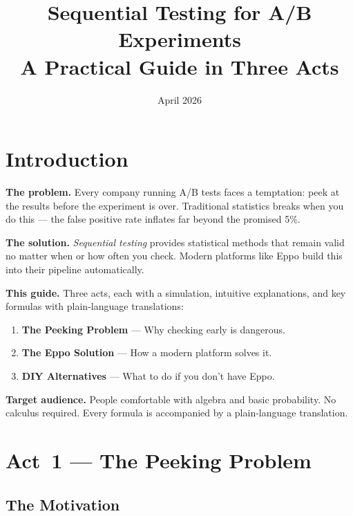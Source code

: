 \documentclass[12pt, a4paper]{article}
\title{\textbf{Sequential Testing for A/B Experiments}\\[6pt]
       \large A Practical Guide in Three Acts}
\author{}
\date{April 2026}
\begin{document}
\maketitle
\tableofcontents
\newpage

\section*{Introduction}

\textbf{The problem.}
Every company running A/B tests faces a temptation: peek at the results
before the experiment is over.  Traditional statistics breaks when you do
this --- the false positive rate inflates far beyond the promised 5\%.

\textbf{The solution.}
\emph{Sequential testing} provides statistical methods that remain valid
no matter when or how often you check.  Modern platforms like Eppo build
this into their pipeline automatically.

\textbf{This guide.}
Three acts, each with a simulation, intuitive explanations, and key formulas
with plain-language translations:
\begin{enumerate}[nosep]
  \item \textbf{The Peeking Problem} --- Why checking early is dangerous.
  \item \textbf{The Eppo Solution} --- How a modern platform solves it.
  \item \textbf{DIY Alternatives} --- What to do if you don't have Eppo.
\end{enumerate}

\textbf{Target audience.}
People comfortable with algebra and basic probability.  No calculus required.
Every formula is accompanied by a plain-language translation.


\newpage
\section{Act~1 --- The Peeking Problem}

\subsection{The Motivation}
\end{document}
